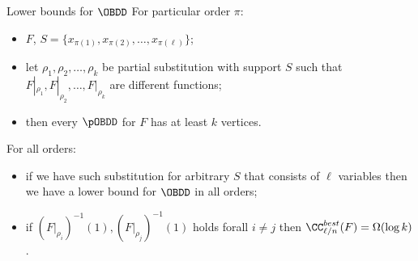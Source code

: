\begin{frame}{Lower bounds for $\OBDD$}
	For particular order $\pi$:
    \begin{itemize}
        \item $F$, $S = \{x_{\pi(1)}, x_{\pi(2)}, \dots, x_{\pi(\ell)} \}$;
        \item let $\rho_1, \rho_2, \dots, \rho_k$ be partial substitution with support $S$ such that
            $F|_{\rho_1}, F|_{\rho_2}, \dots, F|_{\rho_k}$ are different functions;
        \item then every $\pOBDD$ for $F$ has at least $k$ vertices.
    \end{itemize}

    \pause
    For all orders:
    \begin{itemize}
        \item if we have such substitution for arbitrary $S$ that consists of $\ell$ variables then we
            have a lower bound for $\OBDD$ in all orders;
    \end{itemize}

    \pause

    \begin{itemize}
        \item if $(F|_{\rho_i})^{-1}(1), (F|_{\rho_j})^{-1}(1)$ holds forall $i \neq j$ then
            $\CC^{best}_{\ell / n} (F) = \Omega(\log k)$.
    \end{itemize}
    
\end{frame}

